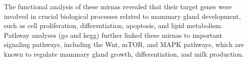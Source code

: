 The functional analysis of these \glspl{mirna} revealed that their target genes
were involved in crucial biological processes related to mammary gland
development, such as cell proliferation, differentiation, apoptosis, and lipid
metabolism.
Pathway analyses (\gls{go} and \gls{kegg}) further linked these \glspl{mirna}
to important signaling pathways, including the Wnt, mTOR, and MAPK pathways,
which are known to regulate mammary gland growth, differentiation, and milk
production\supercite{wang_dynamic_2022}.
